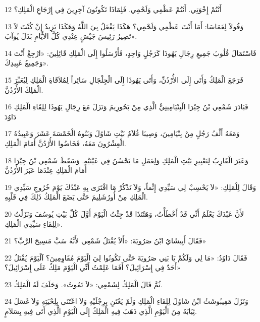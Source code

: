 \par 12 أَنْتُمْ إِخْوَتِي. أَنْتُمْ عَظْمِي وَلَحْمِي. فَلِمَاذَا تَكُونُونَ آخِرِينَ فِي إِرْجَاعِ الْمَلِكِ؟
\par 13 وَقُولاَ لِعَمَاسَا: أَمَا أَنْتَ عَظْمِي وَلَحْمِي؟ هَكَذَا يَفْعَلُ بِيَ اللَّهُ وَهَكَذَا يَزِيدُ إِنْ كُنْتَ لاَ تَصِيرُ رَئِيسَ جَيْشٍ عِنْدِي كُلَّ الأَيَّامِ بَدَلَ يُوآبَ».
\par 14 فَاسْتَمَالَ قُلُوبَ جَمِيعِ رِجَالِ يَهُوذَا كَرَجُلٍ وَاحِدٍ، فَأَرْسَلُوا إِلَى الْمَلِكِ قَائِلِينَ: «ارْجِعْ أَنْتَ وَجَمِيعُ عَبِيدِكَ».
\par 15 فَرَجَعَ الْمَلِكُ وَأَتَى إِلَى الأُرْدُنِّ، وَأَتَى يَهُوذَا إِلَى الْجِلْجَالِ سَائِراً لِمُلاَقَاةِ الْمَلِكِ لِيُعَبِّرَ الْمَلِكَ الأُرْدُنَّ.
\par 16 فَبَادَرَ شَمْعِي بْنُ جِيْرَا الْبِنْيَامِينِيُّ الَّذِي مِنْ بَحُورِيمَ وَنَزَلَ مَعَ رِجَالِ يَهُوذَا لِلِقَاءِ الْمَلِكِ دَاوُدَ
\par 17 وَمَعَهُ أَلْفُ رَجُلٍ مِنْ بِنْيَامِينَ، وَصِيبَا غُلاَمُ بَيْتِ شَاوُلَ وَبَنُوهُ الْخَمْسَةَ عَشَرَ وَعَبِيدُهُ الْعِشْرُونَ مَعَهُ، فَخَاضُوا الأُرْدُنَّ أَمَامَ الْمَلِكِ.
\par 18 وَعَبَرَ الْقَارِبُ لِتَعْبِيرِ بَيْتِ الْمَلِكِ وَلِعَمَلِ مَا يَحْسُنُ فِي عَيْنَيْهِ. وَسَقَطَ شَمْعِي بْنُ جِيْرَا أَمَامَ الْمَلِكِ عِنْدَمَا عَبَرَ الأُرْدُنَّ
\par 19 وَقَالَ لِلْمَلِكِ: «لاَ يَحْسِبْ لِي سَيِّدِي إِثْماً، وَلاَ تَذْكُرْ مَا افْتَرَى بِهِ عَبْدُكَ يَوْمَ خُرُوجِ سَيِّدِي الْمَلِكِ مِنْ أُورُشَلِيمَ حَتَّى يَضَعَ الْمَلِكُ ذَلِكَ فِي قَلْبِهِ.
\par 20 لأَنَّ عَبْدَكَ يَعْلَمُ أَنِّي قَدْ أَخْطَأْتُ، وَهَئَنَذَا قَدْ جِئْتُ الْيَوْمَ أَوَّلَ كُلِّ بَيْتِ يُوسُفَ وَنَزَلْتُ لِلِقَاءِ سَيِّدِي الْمَلِكِ».
\par 21 فَقَالَ أَبِيشَايُ ابْنُ صَرُويَةَ: «أَلاَ يُقْتَلُ شَمْعِي لأَنَّهُ سَبَّ مَسِيحَ الرَّبِّ؟»
\par 22 فَقَالَ دَاوُدُ: «مَا لِي وَلَكُمْ يَا بَنِي صَرُويَةَ حَتَّى تَكُونُوا لِيَ الْيَوْمَ مُقَاوِمِينَ؟ آلْيَوْمَ يُقْتَلُ أَحَدٌ فِي إِسْرَائِيلَ؟ أَفَمَا عَلِمْتُ أَنِّي الْيَوْمَ مَلِكٌ عَلَى إِسْرَائِيلَ؟»
\par 23 ثُمَّ قَالَ الْمَلِكُ لِشَمْعِي: «لاَ تَمُوتُ». وَحَلَفَ لَهُ الْمَلِكُ.
\par 24 وَنَزَلَ مَفِيبُوشَثُ ابْنُ شَاوُلَ لِلِقَاءِ الْمَلِكِ وَلَمْ يَعْتَنِ بِرِجْلَيْهِ وَلاَ اعْتَنَى بِلِحْيَتِهِ وَلاَ غَسَلَ ثِيَابَهُ مِنَ الْيَوْمِ الَّذِي ذَهَبَ فِيهِ الْمَلِكُ إِلَى الْيَوْمِ الَّذِي أَتَى فِيهِ بِسَلاَمٍ.
